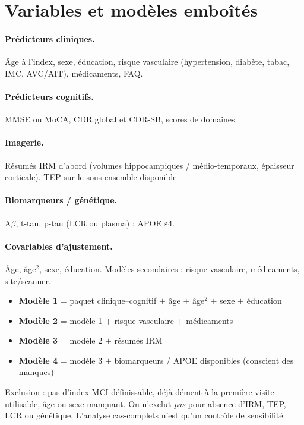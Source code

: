 \section{Variables et modèles emboîtés}

\paragraph{Prédicteurs cliniques.} Âge à l'index, sexe, éducation, risque vasculaire (hypertension, diabète, tabac, IMC, AVC/AIT), médicaments, FAQ.

\paragraph{Prédicteurs cognitifs.} MMSE ou MoCA, CDR global et CDR-SB, scores de domaines.

\paragraph{Imagerie.} Résumés IRM d'abord (volumes hippocampiques / médio-temporaux, épaisseur corticale). TEP sur le sous-ensemble disponible.

\paragraph{Biomarqueurs / génétique.} $\mathrm{A}\beta$, t-tau, p-tau (LCR ou plasma) ; APOE $\varepsilon 4$.

\paragraph{Covariables d'ajustement.} Âge, âge$^2$, sexe, éducation. Modèles secondaires : risque vasculaire, médicaments, site/scanner.

\begin{itemize}[label=, font=\large \color{darkorange}]
\item \textbf{Modèle 1} = paquet clinique--cognitif $+$ âge $+$ âge$^2$ $+$ sexe $+$ éducation
\item \textbf{Modèle 2} = modèle 1 $+$ risque vasculaire $+$ médicaments
\item \textbf{Modèle 3} = modèle 2 $+$ résumés IRM
\item \textbf{Modèle 4} = modèle 3 $+$ biomarqueurs / APOE disponibles (conscient des manques)
\end{itemize}

Exclusion : pas d'index MCI définissable, déjà dément à la première visite utilisable, âge ou sexe manquant. On n'exclut \emph{pas} pour absence d'IRM, TEP, LCR ou génétique. L'analyse cas-complets n'est qu'un contrôle de sensibilité.

